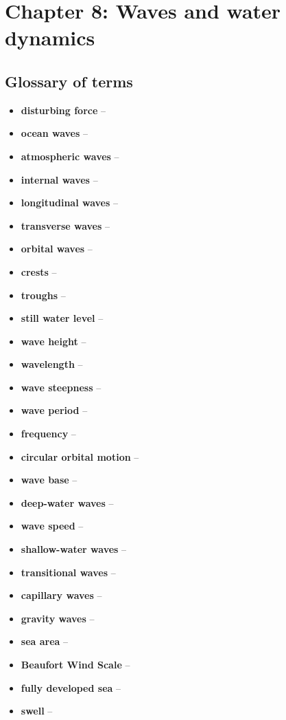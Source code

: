\section{Chapter 8: Waves and water dynamics}

\subsection{Glossary of terms}

\begin{itemize}
    \item \textbf{disturbing force} --
    \item \textbf{ocean waves} --
    \item \textbf{atmospheric waves} --
    \item \textbf{internal waves} --
    \item \textbf{longitudinal waves} --
    \item \textbf{transverse waves} --
    \item \textbf{orbital waves} --
    \item \textbf{crests} --
    \item \textbf{troughs} --
    \item \textbf{still water level} --
    \item \textbf{wave height} --
    \item \textbf{wavelength} --
    \item \textbf{wave steepness} --
    \item \textbf{wave period} --
    \item \textbf{frequency} --
    \item \textbf{circular orbital motion} --
    \item \textbf{wave base} --
    \item \textbf{deep-water waves} --
    \item \textbf{wave speed} --
    \item \textbf{shallow-water waves} --
    \item \textbf{transitional waves} --
    \item \textbf{capillary waves} --
    \item \textbf{gravity waves} --
    \item \textbf{sea area} --
    \item \textbf{Beaufort Wind Scale} --
    \item \textbf{fully developed sea} --
    \item \textbf{swell} --

\end{itemize}
